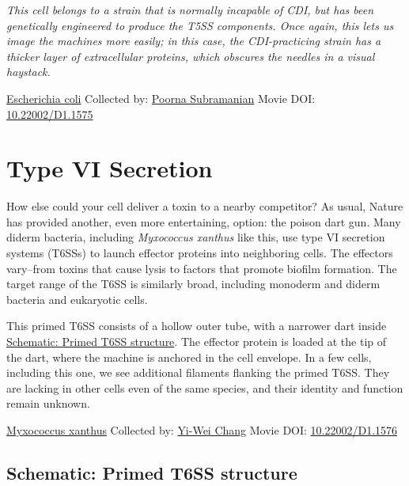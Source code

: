 \documentclass[]{tufte-book}
\begin{document}
\emph{This cell belongs to a strain that is normally incapable of CDI, but has been genetically engineered to produce the T5SS components. Once again, this lets us image the machines more easily; in this case, the CDI-practicing strain has a thicker layer of extracellular proteins, which obscures the needles in a visual haystack.}



\hypertarget{htmlwidget-df64dc27f046f65e0554}{}

\label{fig:9-5}\protect\hyperlink{tree}{Escherichia coli} Collected by: \protect\hyperlink{poorna_subramanian}{Poorna Subramanian} Movie DOI: \href{https://doi.org/10.22002/D1.1575}{10.22002/D1.1575}

\hypertarget{type-vi-secretion}{%
\section{Type VI Secretion}\label{type-vi-secretion}}

How else could your cell deliver a toxin to a nearby competitor? As usual, Nature has provided another, even more entertaining, option: the poison dart gun. Many diderm bacteria, including \emph{Myxococcus xanthus} like this, use type VI secretion systems (T6SSs) to launch effector proteins into neighboring cells. The effectors vary--from toxins that cause lysis to factors that promote biofilm formation. The target range of the T6SS is similarly broad, including monoderm and diderm bacteria and eukaryotic cells.

This primed T6SS consists of a hollow outer tube, with a narrower dart inside \protect\hyperlink{Primed_T6SS_structure}{Schematic: Primed T6SS structure}. The effector protein is loaded at the tip of the dart, where the machine is anchored in the cell envelope. In a few cells, including this one, we see additional filaments flanking the primed T6SS. They are lacking in other cells even of the same species, and their identity and function remain unknown.



\hypertarget{htmlwidget-60dca4cc796f6b4cd7fd}{}

\label{fig:9-6}\protect\hyperlink{tree}{Myxococcus xanthus} Collected by: \protect\hyperlink{yi-wei_chang}{Yi-Wei Chang} Movie DOI: \href{https://doi.org/10.22002/D1.1576}{10.22002/D1.1576}

\hypertarget{Primed_T6SS_structure}{%
\subsection*{Schematic: Primed T6SS structure}\label{Primed_T6SS_structure}}
\end{document}
